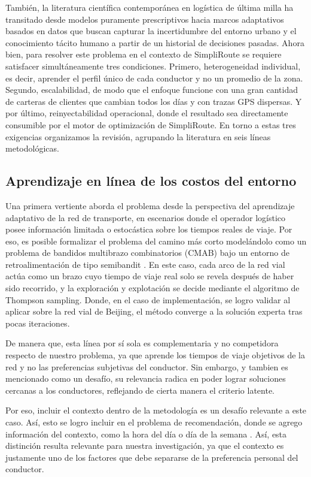 También, la literatura científica contemporánea en logística de última milla ha transitado desde modelos puramente prescriptivos hacia marcos adaptativos basados en datos que buscan capturar la incertidumbre del entorno urbano y el conocimiento tácito humano a partir de un historial de decisiones pasadas. Ahora bien, para resolver este problema en el contexto de SimpliRoute se requiere satisfacer simultáneamente tres condiciones. Primero, heterogeneidad individual, es decir, aprender el perfil único de cada conductor y no un promedio de la zona. Segundo, escalabilidad, de modo que el enfoque funcione con una gran cantidad de carteras de clientes que cambian todos los días y con trazas GPS dispersas. Y por último, reinyectabilidad operacional, donde el resultado sea directamente consumible por el motor de optimización de SimpliRoute. En torno a estas tres exigencias organizamos la revisión, agrupando la literatura en seis líneas metodológicas.

\subsection{Aprendizaje en línea de los costos del entorno}

Una primera vertiente aborda el problema desde la perspectiva del aprendizaje adaptativo de la red de transporte, en escenarios donde el operador logístico posee información limitada o estocástica sobre los tiempos reales de viaje. Por eso, es posible formalizar el problema del camino más corto modelándolo como un problema de bandidos multibrazo combinatorios (CMAB) bajo un entorno de retroalimentación de tipo semibandit \cite{lagos2024online}. En este caso, cada arco de la red vial actúa como un brazo cuyo tiempo de viaje real solo se revela después de haber sido recorrido, y la exploración y explotación se decide mediante el algoritmo de Thompson sampling. Donde, en el caso de implementación, se logro validar al aplicar sobre la red vial de Beijing, el método converge a la solución experta tras pocas iteraciones.

De manera que, esta línea por sí sola es complementaria y no competidora respecto de nuestro problema, ya que aprende los tiempos de viaje objetivos de la red y no las preferencias subjetivas del conductor. Sin embargo, y tambien es mencionado como un desafío, su relevancia radica en poder lograr soluciones cercanas a los conductores, reflejando de cierta manera el criterio latente. 

Por eso, incluir el contexto dentro de la metodología es un desafío relevante a este caso. Así, esto se logro incluir en el problema de recomendación, donde se agrego información del contexto, como la hora del día o día de la semana \cite{li2010contextual}. Así, esta distinción resulta relevante para nuestra investigación, ya que el contexto es justamente uno de los factores que debe separarse de la preferencia personal del conductor.


